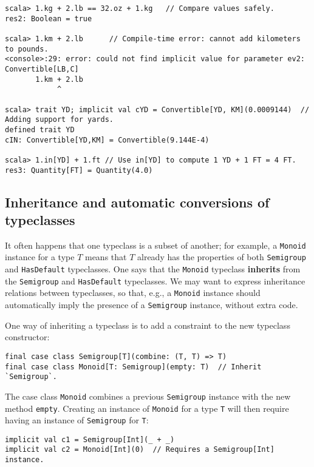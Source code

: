 \begin{lstlisting}[frame=single,fillcolor={\color{black}},framesep={0.2mm},framexleftmargin=2mm,framexrightmargin=2mm,framextopmargin=2mm,framexbottommargin=2mm]
scala> 1.kg + 2.lb == 32.oz + 1.kg   // Compare values safely.
res2: Boolean = true

scala> 1.km + 2.lb      // Compile-time error: cannot add kilometers to pounds.
<console>:29: error: could not find implicit value for parameter ev2: Convertible[LB,C]
       1.km + 2.lb
            ^

scala> trait YD; implicit val cYD = Convertible[YD, KM](0.0009144)  // Adding support for yards.
defined trait YD
cIN: Convertible[YD,KM] = Convertible(9.144E-4)

scala> 1.in[YD] + 1.ft // Use in[YD] to compute 1 YD + 1 FT = 4 FT.
res3: Quantity[FT] = Quantity(4.0)
\end{lstlisting}


\subsection{Inheritance and automatic conversions of typeclasses\label{subsec:Inheritance-and-automatic-typeclass}}

It often happens that one typeclass is a subset of another; for example,
a \lstinline!Monoid! instance for a type $T$ means that $T$ already
has the properties of both \lstinline!Semigroup! and \lstinline!HasDefault!
typeclasses. One says that the \lstinline!Monoid! typeclass \textbf{inherits}
from the \lstinline!Semigroup! and \lstinline!HasDefault! typeclasses.
We may want to express inheritance relations between typeclasses,
so that, e.g., a \lstinline!Monoid! instance should automatically
imply the presence of a \lstinline!Semigroup! instance, without extra
code.

One way of inheriting a typeclass is to add a constraint to the new
typeclass constructor:
\begin{lstlisting}
final case class Semigroup[T](combine: (T, T) => T)
final case class Monoid[T: Semigroup](empty: T)  // Inherit `Semigroup`.
\end{lstlisting}
The case class \lstinline!Monoid! combines a previous \lstinline!Semigroup!
instance with the new method \lstinline!empty!. Creating an instance
of \lstinline!Monoid! for a type \lstinline!T! will then require
having an instance of \lstinline!Semigroup! for \lstinline!T!:
\begin{lstlisting}
implicit val c1 = Semigroup[Int](_ + _)
implicit val c2 = Monoid[Int](0)  // Requires a Semigroup[Int] instance.
\end{lstlisting}

